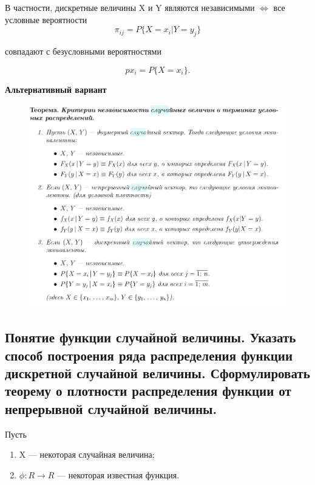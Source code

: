 В частности, дискретные величины X и Y являются независимыми $\Leftrightarrow$ все условные вероятности
\begin{equation}
	\pi_{ij} = P\{X = x_i |Y = y_j\}
\end{equation}

совпадают с безусловными вероятностями 

\begin{equation}
	px_i = P\{X = x_i\}.
\end{equation}

\textbf{Альтернативный вариант}

\begin{figure}[ht!]
	\centering
	\includegraphics[width=0.9\linewidth]{assets/amosus.png}
\end{figure}

\newpage

\subsection{Понятие функции случайной величины. Указать способ построения ряда распределения функции дискретной случайной величины. Сформулировать теорему о плотности распределения функции от непрерывной случайной величины.}

Пусть

\begin{enumerate}
	\item X --- некоторая случайная величина;
	\item $\phi : R \rightarrow R$ --- некоторая известная функция. 
\end{enumerate}

